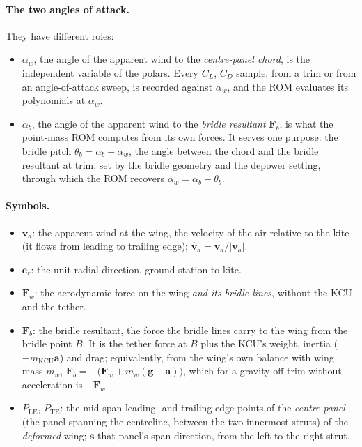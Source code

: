 \documentclass[11pt,a4paper]{article}
\begin{document}
\paragraph{The two angles of attack.} They have different roles:
\begin{itemize}
  \item $\alpha_w$, the angle of the apparent wind to the \emph{centre-panel
        chord}, is the independent variable of the polars. Every $C_L$, $C_D$
        sample, from a trim or from an angle-of-attack sweep, is recorded
        against $\alpha_w$, and the ROM evaluates its polynomials at
        $\alpha_w$.
  \item $\alpha_b$, the angle of the apparent wind to the \emph{bridle
        resultant} $\mathbf F_b$, is what the point-mass ROM computes from its
        own forces. It serves one purpose: the bridle pitch
        $\theta_b=\alpha_b-\alpha_w$, the angle between the chord and the
        bridle resultant at trim, set by the bridle geometry and the depower
        setting, through which the ROM recovers $\alpha_w=\alpha_b-\theta_b$.
\end{itemize}

\paragraph{Symbols.}
\begin{itemize}
  \item $\mathbf v_a$: the apparent wind at the wing, the velocity of the air
        relative to the kite (it flows from leading to trailing edge);
        $\hat{\mathbf v}_a=\mathbf v_a/|\mathbf v_a|$.
  \item $\mathbf e_r$: the unit radial direction, ground station to kite.
  \item $\mathbf F_w$: the aerodynamic force on the wing \emph{and its bridle
        lines}, without the KCU and the tether.
  \item $\mathbf F_b$: the bridle resultant, the force the bridle lines carry
        to the wing from the bridle point $B$. It is the tether force at $B$
        plus the KCU's weight, inertia ($-m_\mathrm{KCU}\mathbf a$) and drag;
        equivalently, from the wing's own balance with wing mass $m_w$,
        $\mathbf F_b=-\bigl(\mathbf F_w+m_w(\mathbf g-\mathbf a)\bigr)$, which
        for a gravity-off trim without acceleration is $-\mathbf F_w$.
  \item $P_\mathrm{LE}$, $P_\mathrm{TE}$: the mid-span leading- and
        trailing-edge points of the \emph{centre panel} (the panel spanning
        the centreline, between the two innermost struts) of the
        \emph{deformed} wing; $\mathbf s$ that panel's span direction, from
        the left to the right strut.
\end{itemize}
\end{document}
